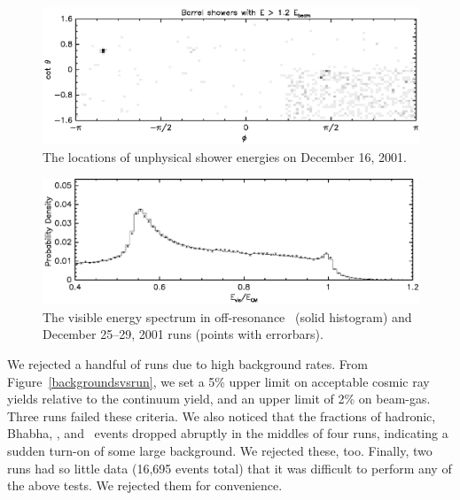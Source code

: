 \documentclass{cornell}
\begin{document}
\begin{figure}[p]
  \begin{center}
    \includegraphics[width=0.85\linewidth]{higheshowers}
  \end{center}
  \caption[Geometry of unphysically energetic showers on December 16,
  2001]{\label{higheshowers} The locations of unphysical shower
  energies on December 16, 2001.}
\end{figure}

\begin{figure}[p]
  \begin{center}
    \includegraphics[width=0.85\linewidth]{higheendcapvisen}
  \end{center}
  \caption[Visible energy distribution on December 25--29,
  2001]{\label{higheendcapvisen} The visible energy spectrum in
  off-resonance \usss\ (solid histogram) and December 25--29, 2001
  runs (points with errorbars).}
\end{figure}

We rejected a handful of runs due to high background rates.  From
Figure~\ref{backgroundsvsrun}, we set a 5\% upper limit on acceptable
cosmic ray yields relative to the continuum yield, and an upper limit
of 2\% on beam-gas.  Three runs failed these criteria.  We also
noticed that the fractions of hadronic, Bhabha, \gamgam, and \mumu\
events dropped abruptly in the middles of four runs, indicating a
sudden turn-on of some large background.  We rejected these, too.
Finally, two runs had so little data (16,695 events total) that it was
difficult to perform any of the above tests.  We rejected them for
convenience.
\end{document}
